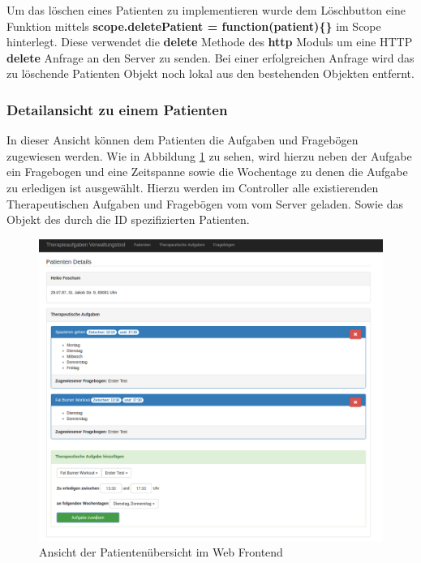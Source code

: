Um das löschen eines Patienten zu implementieren wurde dem Löschbutton eine Funktion mittels \textbf{scope.deletePatient = function(patient)\{\}} im Scope hinterlegt. Diese verwendet die \textbf{delete} Methode des \textbf{http} Moduls um eine HTTP \textbf{delete} Anfrage an den Server zu senden. Bei einer erfolgreichen Anfrage wird das zu löschende Patienten Objekt noch lokal aus den bestehenden Objekten entfernt.
\newpage
\subsubsection{Detailansicht zu einem Patienten}\label{_ImpTCPatientDetail}
In dieser Ansicht können dem Patienten die Aufgaben und Fragebögen zugewiesen werden. Wie in Abbildung \ref{PatientDetailsAufgaben} zu sehen, wird hierzu neben der Aufgabe ein Fragebogen und eine Zeitspanne sowie die Wochentage zu denen die Aufgabe zu erledigen ist ausgewählt. Hierzu werden im Controller alle existierenden Therapeutischen Aufgaben und Fragebögen vom vom Server geladen. Sowie das Objekt des durch die ID spezifizierten Patienten.

\begin{figure}[H]
	\centering
	\includegraphics[scale=0.3]{images/Screenshots/PatientDetailsAufgaben}
	\caption[Ansicht der Patientenübersicht im Web Frontend]{Ansicht der Patientenübersicht im Web Frontend}
	\label{PatientDetailsAufgaben}
\end{figure}


